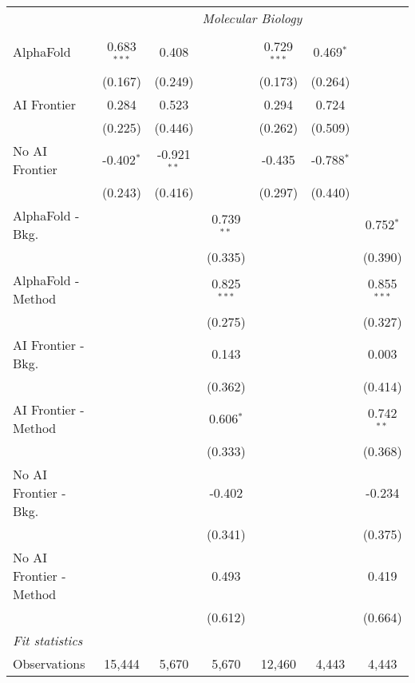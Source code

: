\begin{tabular}{lcccccc}
 & \multicolumn{6}{c}{\textit{Molecular Biology}} \\ \\
   AlphaFold               & 0.683$^{***}$ & 0.408         &               & 0.729$^{***}$ & 0.469$^{*}$  &   \\   
                           & (0.167)       & (0.249)       &               & (0.173)       & (0.264)      &   \\   
   AI Frontier             & 0.284         & 0.523         &               & 0.294         & 0.724        &   \\   
                           & (0.225)       & (0.446)       &               & (0.262)       & (0.509)      &   \\   
   No AI Frontier          & -0.402$^{*}$  & -0.921$^{**}$ &               & -0.435        & -0.788$^{*}$ &   \\   
                           & (0.243)       & (0.416)       &               & (0.297)       & (0.440)      &   \\   
   AlphaFold - Bkg.        &               &               & 0.739$^{**}$  &               &              & 0.752$^{*}$\\   
                           &               &               & (0.335)       &               &              & (0.390)\\   
   AlphaFold - Method      &               &               & 0.825$^{***}$ &               &              & 0.855$^{***}$\\   
                           &               &               & (0.275)       &               &              & (0.327)\\   
   AI Frontier - Bkg.      &               &               & 0.143         &               &              & 0.003\\   
                           &               &               & (0.362)       &               &              & (0.414)\\   
   AI Frontier - Method    &               &               & 0.606$^{*}$   &               &              & 0.742$^{**}$\\   
                           &               &               & (0.333)       &               &              & (0.368)\\   
   No AI Frontier - Bkg.   &               &               & -0.402        &               &              & -0.234\\   
                           &               &               & (0.341)       &               &              & (0.375)\\   
   No AI Frontier - Method &               &               & 0.493         &               &              & 0.419\\   
                           &               &               & (0.612)       &               &              & (0.664)\\   
   \midrule
   \emph{Fit statistics}\\
   Observations            & 15,444        & 5,670         & 5,670         & 12,460        & 4,443        & 4,443\\  
   

\end{tabular}
